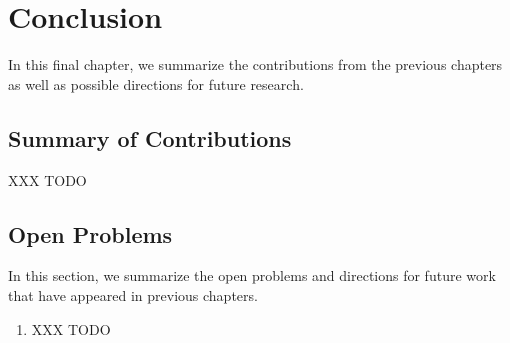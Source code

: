 \chapter{Conclusion}
\label{:conclusion}

In this final chapter, we summarize the contributions from the previous chapters as well as possible directions for future research.

\section{Summary of Contributions}
\label{:conclusion:contributions}

XXX TODO


\section{Open Problems}
\label{:conclusion:open-problems}

In this section, we summarize the open problems and directions for future work that have appeared in previous chapters.

\begin{enumerate}
\item XXX TODO

\end{enumerate}
